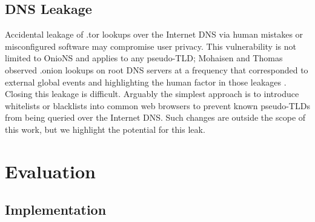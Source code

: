 \documentclass[USenglish,oneside,twocolumn]{article}
\begin{document}
\subsection{DNS Leakage}

Accidental leakage of .tor lookups over the Internet DNS via human mistakes or misconfigured software may compromise user privacy. This vulnerability is not limited to OnioNS and applies to any pseudo-TLD; Mohaisen and Thomas observed .onion lookups on root DNS servers at a frequency that corresponded to external global events and highlighting the human factor in those leakages \cite{thomasmeasuring}. Closing this leakage is difficult. Arguably the simplest approach is to introduce whitelists or blacklists into common web browsers to prevent known pseudo-TLDs from being queried over the Internet DNS. Such changes are outside the scope of this work, but we highlight the potential for this leak.




\vspace{-5px}

\section{Evaluation}
\label{sec:Evaluation}

\subsection{Implementation}
\end{document}
